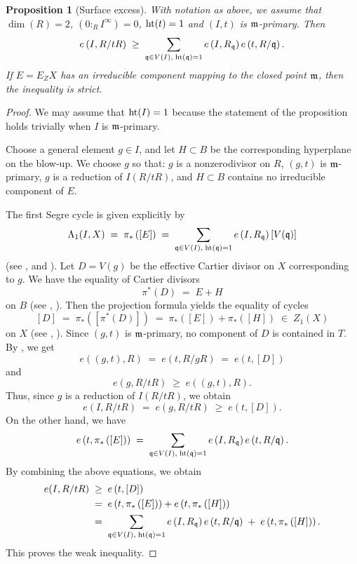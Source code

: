 \documentclass[a4paper, 11pt]{amsart}
\newcommand{\mm}{{\normalfont\mathfrak{m}}}
\newcommand{\qq}{{\mathfrak{q}}}
\newcommand{\HT}{\normalfont\text{ht}}
\newtheorem{proposition}[proposition]{Proposition}
\theoremstyle{definition}
\begin{document}
	\begin{proposition}[Surface excess]\label{prop_surface_excess}
		With notation as above, we assume that $\dim(R)=2$, $(0:_RI^\infty) = 0$, $\HT(t)=1$ and $(I,t)$ is $\mm$-primary.
		Then
		$$
		e\left(I,R/tR\right)
		\;\ge\;
		\sum_{\qq \in V(I),\; \HT(\qq)=1}
		e\left(I,R_\qq\right)e\left(t,R/\qq\right).
		$$
		If $E=E_ZX$ has an irreducible component mapping to the closed point
		$\mm$, then the inequality is strict.
	\end{proposition}
	\begin{proof}
		We may assume that $\HT(I) = 1$ because the statement of the proposition holds trivially when $I$ is $\mm$-primary.
		
		Choose a general element $g\in I$, and let $H \subset B$ be the corresponding hyperplane on the blow-up.  
		We choose $g$ so that: $g$ is a nonzerodivisor on $R$, $(g,t)$ is $\mm$-primary, $g$ is a reduction of $I(R/tR)$, and $H \subset B$ contains no irreducible component of $E$.
		
		The first Segre cycle is given explicitly by 
		$$
		\Lambda_1(I, X) \;=\; \pi_*\left(\left[E\right]\right) \;=\; \sum_{\qq\in V(I),\; \HT(\qq)=1}
		e\left(I,R_\qq\right)\left[V(\qq)\right]
		$$
		(see \cite[Theorem~C(ii)]{CRPU}, \cite[Proposition~2.4(a)]{PTUV} and \cite[Proposition~2.3(iii)]{AM}).
		Let $D = V(g)$ be the effective Cartier divisor on $X$ corresponding to $g$.
		We have the equality of Cartier divisors 
		$$
		\pi^*(D) \;=\; E + H
		$$
		on $B$ (see \cite[Proposition 5.8]{CRPU}, \cite[Lemma 2.4]{Fu}).
		Then the projection formula yields the equality of cycles
		$$
		\left[D\right]\;=\; \pi_*\left(\left[\pi^*(D)\right]\right) \;=\; \pi_*\left(\left[E\right]\right) + \pi_*\left(\left[H\right]\right) \;\in\; Z_1(X)
		$$
		on $X$ (see \cite[Proposition 1.4]{Fu}, \cite[\href{https://stacks.math.columbia.edu/tag/02RT}{Tag 02RT}]{stacks-project}).
		Since $(g,t)$ is $\mm$-primary, no component of $D$ is contained in $T$.
		By \cite[Corollary 1.2.14]{FOV}, we get
		$$
		e\left((g,t),R\right) \;=\; e\left(t, R/gR\right) \;=\; e\left(t, \left[D\right]\right)
		$$
		and 
		$$
		e\left(g, R/tR\right) \;\ge\; e\left((g,t),R\right).
		$$
		Thus, since $g$ is a reduction of
		$I(R/tR)$, we obtain
		$$
		e(I,R/tR) \;=\; e\left(g, R/tR\right) \;\geq \; e\left(t, \left[D\right]\right).
		$$
		On the other hand, we have
		$$
		e\left(t, \pi_*\left(\left[E\right]\right)\right)
		\;=\;
		\sum_{\qq\in V(I),\; \HT
			(\qq)=1}
		e\left(I,R_\qq\right)e\left(t,R/\qq\right).
		$$
		By combining the above equations, we obtain 
		\begin{align}
			\begin{split}
				\label{eq_surface_excess}
				e(I,R/tR) &\;\ge\; e\left(t, \left[D\right]\right) \\
				&\;=\; e\left(t, \pi_*\left(\left[E\right]\right)\right) + e\left(t, \pi_*\left(\left[H\right]\right)\right) \\
				&\;=\; \sum_{\qq\in V(I),\; \HT
					(\qq)=1}
				e\left(I,R_\qq\right)e\left(t,R/\qq\right) \;+\; e\left(t, \pi_*\left(\left[H\right]\right)\right).
			\end{split}
		\end{align}
		This proves the weak inequality.
		

\end{proof}
\end{document}
